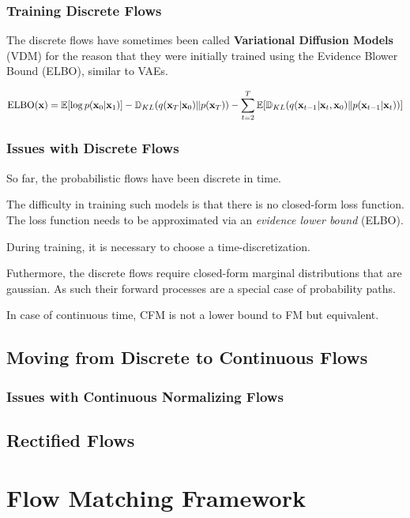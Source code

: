 \documentclass[a4paper, 11pt]{article}
\begin{document}
\subsubsection{Training Discrete Flows}
The discrete flows have sometimes been called \textbf{Variational Diffusion Models} (VDM) \citep{kingma2021variational} for the reason that they were initially trained using the Evidence Blower Bound (ELBO), similar to VAEs.



\begin{align}
    \text{ELBO}(\mbox{$\mbox{$\mathbf{x}$}$}) = \mathbb{E}[\log p(\mbox{$\mbox{$\mathbf{x}$}$}_0 | \mbox{$\mbox{$\mathbf{x}$}$}_1)] - \mathbb{D}_{KL}(q(\mbox{$\mbox{$\mathbf{x}$}$}_T | \mbox{$\mbox{$\mathbf{x}$}$}_0) \| p(\mbox{$\mbox{$\mathbf{x}$}$}_T)) - \sum_{t=2}^T \mathbb{E}[\mathbb{D}_{KL}(q(\mbox{$\mbox{$\mathbf{x}$}$}_{t-1} | \mbox{$\mbox{$\mathbf{x}$}$}_t, \mbox{$\mbox{$\mathbf{x}$}$}_0) \| p(\mbox{$\mbox{$\mathbf{x}$}$}_{t-1}|\mbox{$\mbox{$\mathbf{x}$}$}_t))]
\end{align}


\subsubsection{Issues with Discrete Flows}
So far, the probabilistic flows have been discrete in time.

The difficulty in training such models is that there is no closed-form loss function. The loss function needs to be approximated via an \emph{evidence lower bound} (ELBO).

During training, it is necessary to choose a time-discretization.

Futhermore, the discrete flows require closed-form marginal distributions that are gaussian. As such their forward processes are a special case of probability paths.


In case of continuous time, CFM is not a lower bound to FM but equivalent.


\subsection{Moving from Discrete to Continuous Flows}


\subsubsection{Issues with Continuous Normalizing Flows}

\subsection{Rectified Flows}

\section{Flow Matching Framework}
\end{document}
